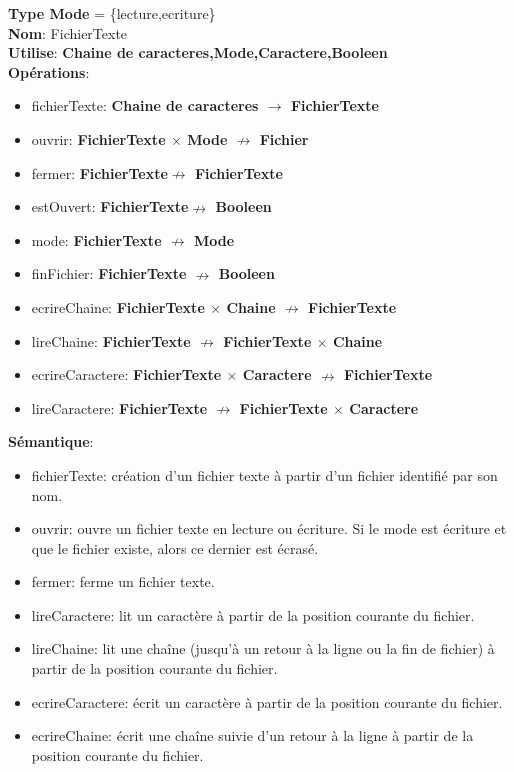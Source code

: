 
    \textbf{Type Mode} = \{lecture,ecriture\} \\
    \textbf{Nom}: FichierTexte \\
    \textbf{Utilise}: \textbf{Chaine de caracteres,Mode,Caractere,Booleen} \\
    \textbf{Opérations}: \begin{itemize}[label=$\ $, leftmargin=2cm, itemsep=0cm]
        \item fichierTexte: \textbf{Chaine de caracteres $\rightarrow $ FichierTexte}
        \item ouvrir: \textbf{FichierTexte $ \times $ Mode $ \nrightarrow$ Fichier}
        \item fermer: \textbf{FichierTexte$  \nrightarrow $ FichierTexte}
        \item estOuvert: \textbf{FichierTexte$ \nrightarrow$  Booleen}
        \item mode: \textbf{FichierTexte $\nrightarrow $ Mode}
        \item finFichier: \textbf{FichierTexte $ \nrightarrow $ Booleen}
        \item ecrireChaine: \textbf{FichierTexte $ \times $ Chaine $ \nrightarrow$  FichierTexte}
        \item lireChaine: \textbf{FichierTexte $ \nrightarrow$  FichierTexte $ \times $ Chaine}
        \item ecrireCaractere: \textbf{FichierTexte $ \times $ Caractere $ \nrightarrow$  FichierTexte}
        \item lireCaractere: \textbf{FichierTexte $ \nrightarrow$  FichierTexte $ \times $ Caractere}
    \end{itemize}
    
    \textbf{Sémantique}: \begin{itemize}[label=$\- $, leftmargin=2cm, itemsep=0cm]
        \item fichierTexte: création d’un fichier texte à partir d’un fichier identifié par son nom.
        \item ouvrir: ouvre un fichier texte en lecture ou écriture. Si le mode est écriture et que le fichier existe, alors ce dernier est écrasé.
        \item fermer: ferme un fichier texte.
        \item lireCaractere: lit un caractère à partir de la position courante du fichier.
        \item lireChaine: lit une chaîne (jusqu'à un retour à la ligne ou la fin de fichier) à partir de la position courante du fichier.
        \item ecrireCaractere: écrit un caractère à partir de la position courante du fichier.
        \item ecrireChaine: écrit une chaîne suivie d'un retour à la ligne à partir de la position courante du fichier.
    \end{itemize}

